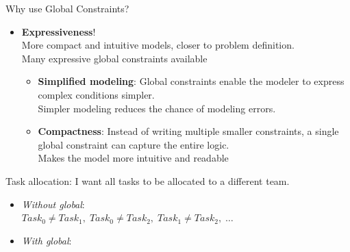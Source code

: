 \documentclass{cons-beamer}
\begin{document}
\begin{frame}{Why use Global Constraints?}
  \begin{itemize}
    \item[+] \textbf{Expressiveness}! \\
      More compact and intuitive models, closer to problem definition. \\ 
      Many expressive global constraints available \vfill 
      \begin{itemize}
        \item \textbf{Simplified modeling}: Global constraints enable the modeler to express complex conditions simpler. \\
              Simpler modeling reduces the chance of modeling errors.

        \item \textbf{Compactness}: Instead of writing multiple smaller constraints, a single global constraint can capture the entire logic. \\
              Makes the model more intuitive and readable
      \end{itemize}
  \end{itemize}
  \vfill

  \begin{example}
    Task allocation: I want all tasks to be allocated to a different team. \\
    \begin{itemize}
      \item \textit{Without global}: \\
            $Task_0 \neq Task_1, \; Task_0 \neq Task_2, \; Task_1 \neq Task_2, \; \dots$
      \item \textit{With global}: 
    \end{itemize}
  \end{example}
\end{frame}
\end{document}
